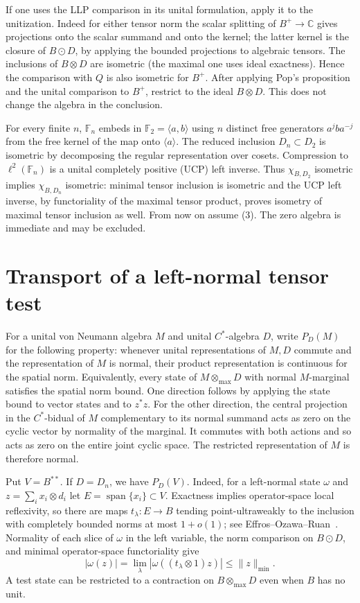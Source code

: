 \documentclass[11pt,a4paper]{article}
\newcommand{\maxx}{\otimes_{\max}}
\newcommand{\F}{\mathbb F}
\begin{document}
If one uses the LLP comparison in its unital formulation, apply it to the unitization. Indeed for either tensor norm the scalar splitting of \(B^+\to\mathbb C\) gives projections onto the scalar summand and onto the kernel; the latter kernel is the closure of \(B\odot D\), by applying the bounded projections to algebraic tensors. The inclusions of \(B\otimes D\) are isometric (the maximal one uses ideal exactness). Hence the comparison with \(Q\) is also isometric for \(B^+\). After applying Pop's proposition and the unital comparison to \(B^+\), restrict to the ideal \(B\otimes D\). This does not change the algebra in the conclusion.

For every finite \(n\), \(\F_n\) embeds in \(\F_2=\langle a,b\rangle\) using \(n\) distinct free generators \(a^jba^{-j}\) from the free kernel of the map onto \(\langle a\rangle\). The reduced inclusion \(D_n\subset D_2\) is isometric by decomposing the regular representation over cosets. Compression to \(\ell^2(\F_n)\) is a unital completely positive (UCP) left inverse. Thus \(\chi_{B,D_2}\) isometric implies \(\chi_{B,D_n}\) isometric: minimal tensor inclusion is isometric and the UCP left inverse, by functoriality of the maximal tensor product, proves isometry of maximal tensor inclusion as well. From now on assume (3). The zero algebra is immediate and may be excluded.

\section{Transport of a left-normal tensor test}
For a unital von Neumann algebra \(M\) and unital \(C^*\)-algebra \(D\), write \(P_D(M)\) for the following property: whenever unital representations of \(M,D\) commute and the representation of \(M\) is normal, their product representation is continuous for the spatial norm. Equivalently, every state of \(M\maxx D\) with normal \(M\)-marginal satisfies the spatial norm bound. One direction follows by applying the state bound to vector states and to \(z^*z\). For the other direction, the central projection in the \(C^*\)-bidual of \(M\) complementary to its normal summand acts as zero on the cyclic vector by normality of the marginal. It commutes with both actions and so acts as zero on the entire joint cyclic space. The restricted representation of \(M\) is therefore normal.

Put \(V=B^{**}\). If \(D=D_n\), we have \(P_D(V)\). Indeed, for a left-normal state \(\omega\) and \(z=\sum_i x_i\otimes d_i\) let \(E=\operatorname{span}\{x_i\}\subset V\). Exactness implies operator-space local reflexivity, so there are maps \(t_\lambda:E\to B\) tending point-ultraweakly to the inclusion with completely bounded norms at most \(1+o(1)\); see Effros--Ozawa--Ruan~\cite[Corollary 4.8]{eor}. Normality of each slice of \(\omega\) in the left variable, the norm comparison on \(B\odot D\), and minimal operator-space functoriality give
\[
 |\omega(z)|=\lim_\lambda|\omega((t_\lambda\otimes1)z)|\leq\|z\|_{\min}.
\]
A test state can be restricted to a contraction on \(B\maxx D\) even when \(B\) has no unit.
\end{document}
